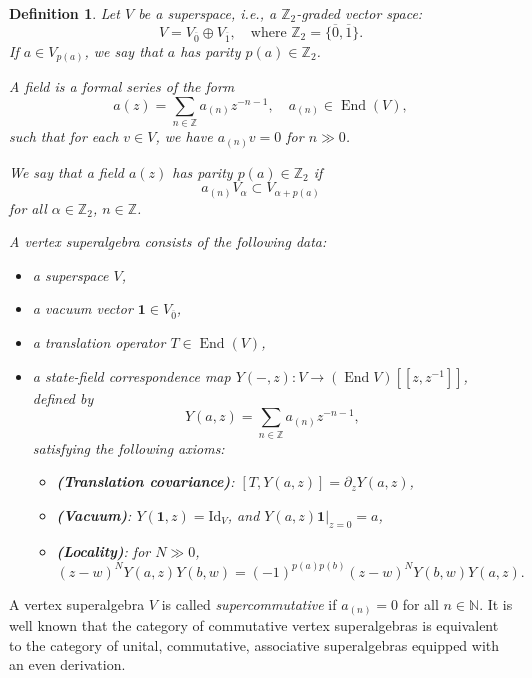 \documentclass[9pt]{amsart}
\newtheorem{definition}{Definition}[section]
\begin{document}
\begin{definition}
Let \( V \) be a superspace, i.e., a \( \mathbb{Z}_2 \)-graded vector space:
\[
V = V_{\overline{0}} \oplus V_{\overline{1}}, \quad \text{where } \mathbb{Z}_2 = \{ \overline{0}, \overline{1} \}.
\]
If \( a \in V_{p(a)} \), we say that \( a \) has parity \( p(a) \in \mathbb{Z}_2 \).

A \emph{field} is a formal series of the form
\[
a(z) = \sum_{n \in \mathbb{Z}} a_{(n)} z^{-n-1}, \quad a_{(n)} \in \operatorname{End}(V),
\]
such that for each \( v \in V \), we have \( a_{(n)} v = 0 \) for \( n \gg 0 \).

We say that a field \( a(z) \) has parity \( p(a) \in \mathbb{Z}_2 \) if
\[
a_{(n)} V_\alpha \subset V_{\alpha + p(a)}
\]
for all \( \alpha \in \mathbb{Z}_2 \), \( n \in \mathbb{Z} \).

A \emph{vertex superalgebra} consists of the following data:
\begin{itemize}
    \item a superspace \( V \),
    \item a vacuum vector \( \mathbf{1} \in V_{\overline{0}} \),
    \item a translation operator \( T \in \operatorname{End}(V) \),
    \item a state-field correspondence map \( Y(-,z): V \to (\operatorname{End}V)[[z, z^{-1}]] \), defined by
    \[
    Y(a,z) = \sum_{n \in \mathbb{Z}} a_{(n)} z^{-n-1},
    \]
    satisfying the following axioms:
    \begin{itemize}
        \item \textbf{(Translation covariance)}: \( [T, Y(a,z)] = \partial_z Y(a,z) \),
        \item \textbf{(Vacuum)}: \( Y(\mathbf{1}, z) = \mathrm{Id}_V \), and \( Y(a,z)\mathbf{1} \big|_{z=0} = a \),
        \item \textbf{(Locality)}: for \( N \gg 0 \),
        \[
        (z - w)^N Y(a,z) Y(b,w) = (-1)^{p(a)p(b)} (z - w)^N Y(b,w) Y(a,z).
        \]
    \end{itemize}
\end{itemize}
\end{definition}




A vertex superalgebra \( V \) is called \emph{supercommutative} if \( a_{(n)} = 0 \) for all \( n \in \mathbb{N} \). It is well known that the category of commutative vertex superalgebras is equivalent to the category of unital, commutative, associative superalgebras equipped with an even derivation.
\end{document}
